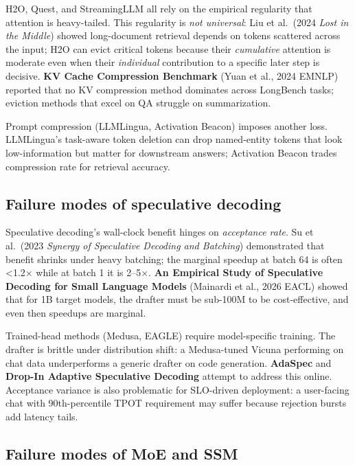 \documentclass{article}
\begin{document}
H2O, Quest, and StreamingLLM all rely on the empirical regularity that attention is heavy-tailed. This regularity is \emph{not universal}: Liu et al.~(2024 \emph{Lost in the Middle}) showed long-document retrieval depends on tokens scattered across the input; H2O can evict critical tokens because their \emph{cumulative} attention is moderate even when their \emph{individual} contribution to a specific later step is decisive. \textbf{KV Cache Compression Benchmark} (Yuan et al., 2024 EMNLP) reported that no KV compression method dominates across LongBench tasks; eviction methods that excel on QA struggle on summarization.

Prompt compression (LLMLingua, Activation Beacon) imposes another loss. LLMLingua's task-aware token deletion can drop named-entity tokens that look low-information but matter for downstream answers; Activation Beacon trades compression rate for retrieval accuracy.

\subsection{Failure modes of speculative decoding}\label{failure-modes-of-speculative-decoding}

Speculative decoding's wall-clock benefit hinges on \emph{acceptance rate}. Su et al.~(2023 \emph{Synergy of Speculative Decoding and Batching}) demonstrated that benefit shrinks under heavy batching; the marginal speedup at batch 64 is often \textless1.2× while at batch 1 it is 2--5×. \textbf{An Empirical Study of Speculative Decoding for Small Language Models} (Mainardi et al., 2026 EACL) showed that for 1B target models, the drafter must be sub-100M to be cost-effective, and even then speedups are marginal.

Trained-head methods (Medusa, EAGLE) require model-specific training. The drafter is brittle under distribution shift: a Medusa-tuned Vicuna performing on chat data underperforms a generic drafter on code generation. \textbf{AdaSpec} \citep{huang20252025} and \textbf{Drop-In Adaptive Speculative Decoding} \citep{liu2025adropinsolutionfor} attempt to address this online. Acceptance variance is also problematic for SLO-driven deployment: a user-facing chat with 90th-percentile TPOT requirement may suffer because rejection bursts add latency tails.

\subsection{Failure modes of MoE and SSM}\label{failure-modes-of-moe-and-ssm}
\end{document}
